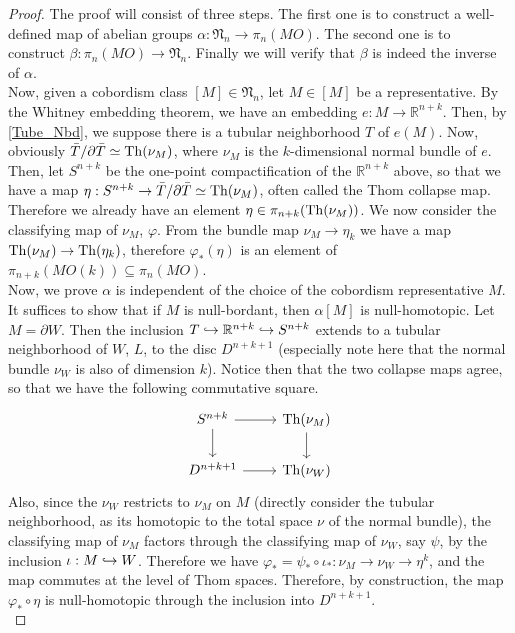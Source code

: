 	\begin{proof}
		The proof will consist of three steps. The first one is to construct a well-defined map of abelian groups $\alpha:\mathfrak{N}_n\to\pi_n(MO)$. The second one is to construct $\beta:\pi_n(MO)\to\mathfrak{N}_n$. Finally we will verify that $\beta$ is indeed the inverse of $\alpha$. \\
		Now, given a cobordism class $[M]\in\mathfrak{N}_n$, let $M\in[M]$ be a representative. By the Whitney embedding theorem, we have an embedding $e:M\to\mathbb{R}^{n+k}$. Then, by \cref{Tube_Nbd}, we suppose there is a tubular neighborhood $T$ of $e(M)$. Now, obviously $\bar{T}/\partial\bar{T}\simeq\operatorname{\mathrm{Th}}(\nu_M)$, where $\nu_M$ is the $k$-dimensional normal bundle of $e$. Then, let $S^{n+k}$ be the one-point compactification of the $\mathbb{R}^{n+k}$ above, so that we have a map $\eta:S^{n+k}\to\bar{T}/\partial\bar{T}\simeq\operatorname{\mathrm{Th}}(\nu_M)$, often called the Thom collapse map. Therefore we already have an element $\eta\in\pi_{n+k}(\operatorname{\mathrm{Th}}(\nu_M))$. We now consider the classifying map of $\nu_M$, $\varphi$. From the bundle map $\nu_M\to\eta_k$ we have a map $\operatorname{\mathrm{Th}}(\nu_M)\to\operatorname{\mathrm{Th}}(\eta_k)$, therefore $\varphi_*(\eta)$ is an element of $\pi_{n+k}(MO(k))\subseteq\pi_n(MO)$. \\
		Now, we prove $\alpha$ is independent of the choice of the cobordism representative $M$. It suffices to show that if $M$ is null-bordant, then $\alpha[M]$ is null-homotopic. Let $M=\partial W$. Then the inclusion $T\hookrightarrow\mathbb{R}^{n+k}\hookrightarrow S^{n+k}$ extends to a tubular neighborhood of $W$, $L$, to the disc $D^{n+k+1}$ (especially note here that the normal bundle $\nu_W$ is also of dimension $k$). Notice then that the two collapse maps agree, so that we have the following commutative square. 
		\[\begin{tikzcd}
			{S^{n+k}} & {\Th(\nu_M)} \\
			{D^{n+k+1}} & {\Th(\nu_W)}
			\arrow[from=1-1, to=1-2]
			\arrow[from=1-1, to=2-1]
			\arrow[from=1-2, to=2-2]
			\arrow[from=2-1, to=2-2]
		\end{tikzcd}\]
		Also, since the $\nu_W$ restricts to $\nu_M$ on $M$ (directly consider the tubular neighborhood, as its homotopic to the total space $\nu$ of the normal bundle), the classifying map of $\nu_M$ factors through the classifying map of $\nu_W$, say $\psi$, by the inclusion $\iota:M\hookrightarrow W$. Therefore we have $\varphi_*=\psi_*\circ\iota_*:\nu_M\to\nu_W\to\eta^k$, and the map commutes at the level of Thom spaces. Therefore, by construction, the map $\varphi_*\circ\eta$ is null-homotopic through the inclusion into $D^{n+k+1}$. \\

\end{proof}
